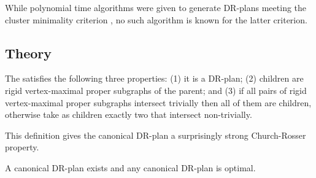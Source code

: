 \begin{enumerate}
    \indent
    While polynomial time algorithms were given to generate DR-plans meeting the cluster minimality criterion \cite{hoffman2001decompositionI}, no such algorithm is known for the latter criterion.
\end{enumerate}

\subsection{Theory}

\begin{definition}\label{def:canonical_drplan}
    The  satisfies the following three properties:
    (1) it is a DR-plan;
    (2) children are rigid vertex-maximal proper subgraphs of the parent; and
    (3) if all pairs of rigid vertex-maximal proper subgraphs intersect trivially then all of them are children, otherwise take as children exactly two that intersect non-trivially.
\end{definition}

This definition gives the canonical DR-plan a surprisingly strong Church-Rosser property.

\begin{theorem}
\label{theorem:canonical_exists_and_is_optimal}
\label{theorem:canonical_is_optimal}
\label{theorem:main}
    A canonical DR-plan exists and any canonical DR-plan is optimal.
\end{theorem}






